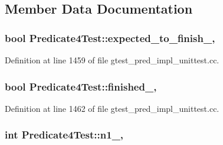 \subsection{Member Data Documentation}
\subsubsection[{\texorpdfstring{expected\+\_\+to\+\_\+finish\+\_\+}{expected_to_finish_}}]{\setlength{\rightskip}{0pt plus 5cm}bool Predicate4\+Test\+::expected\+\_\+to\+\_\+finish\+\_\+\hspace{0.3cm}{\ttfamily [static]}, {\ttfamily [protected]}}\hypertarget{class_predicate4_test_a20600b5eda187c42ce4e812e77269654}{}\label{class_predicate4_test_a20600b5eda187c42ce4e812e77269654}


Definition at line 1459 of file gtest\+\_\+pred\+\_\+impl\+\_\+unittest.\+cc.

\subsubsection[{\texorpdfstring{finished\+\_\+}{finished_}}]{\setlength{\rightskip}{0pt plus 5cm}bool Predicate4\+Test\+::finished\+\_\+\hspace{0.3cm}{\ttfamily [static]}, {\ttfamily [protected]}}\hypertarget{class_predicate4_test_acfd174bf9dfb5a91afbcdca17e797888}{}\label{class_predicate4_test_acfd174bf9dfb5a91afbcdca17e797888}


Definition at line 1462 of file gtest\+\_\+pred\+\_\+impl\+\_\+unittest.\+cc.

\subsubsection[{\texorpdfstring{n1\+\_\+}{n1_}}]{\setlength{\rightskip}{0pt plus 5cm}int Predicate4\+Test\+::n1\+\_\+\hspace{0.3cm}{\ttfamily [static]}, {\ttfamily [protected]}}\hypertarget{class_predicate4_test_a8eb30cd283e613f7a2e501a3969be9ae}{}\label{class_predicate4_test_a8eb30cd283e613f7a2e501a3969be9ae}


